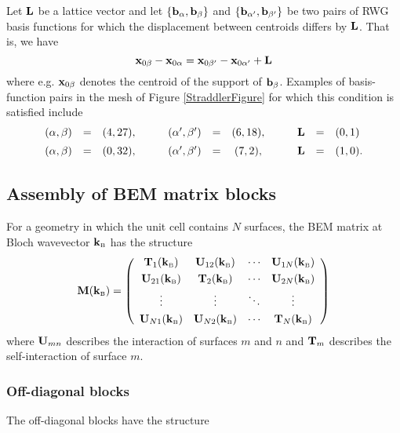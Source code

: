 Let $\mathbf{L}$ be a lattice vector and 
let 
$\{\mathbf{b}_{\alpha}, \mathbf{b}_{\beta}\}$
and 
$\{\mathbf{b}_{\alpha^\prime}, \mathbf{b}_{\beta^\prime}\}$ 
be two pairs of RWG basis functions for which the 
displacement between centroids differs by $\mathbf{L}$.
That is, we have 
$$ \mathbf{x}_{0\beta}-\mathbf{x}_{0\alpha}
   =
   \mathbf{x}_{0\beta^\prime}-\mathbf{x}_{0\alpha^\prime} + \mathbf{L}
$$
where e.g. $\mathbf{x}_{0\beta}$ denotes the centroid of 
the support of $\mathbf{b}_\beta$.
Examples of basis-function pairs in the mesh of 
Figure \ref{StraddlerFigure} for which this condition
is satisfied include
$$\begin{array}{lclclclclcl}
  (\alpha,\beta)&=&(4,27),  
  &\qquad
  (\alpha^\prime,\beta^\prime)&=&(6,18), 
  &\qquad
  \mathbf{L} &=& (0,1)
\\[5pt]
  (\alpha,\beta)&=&(0,32),
  &\qquad
  (\alpha^\prime,\beta^\prime)&=&(7,2), 
  &\qquad
  \mathbf{L} &=& (1,0).
  \end{array}
$$

\subsection{Assembly of BEM matrix blocks}

For a geometry in which the unit cell contains $N$ 
surfaces, the BEM matrix at Bloch wavevector $\mathbf{k}_{\hbox{\tiny{B}}}$ 
has the structure
$$ \mathbf{M}(\mathbf{k}_{\hbox{\tiny{B}}})
 =\left(\begin{array}{cccc}
  \mathbf{T}_1(\mathbf{k}_{\hbox{\tiny{B}}})    & \mathbf{U}_{12}(\mathbf{k}_{\hbox{\tiny{B}}}) & \cdots & \mathbf{U}_{1N}(\mathbf{k}_{\hbox{\tiny{B}}}) \\[3pt]
  \mathbf{U}_{21}(\mathbf{k}_{\hbox{\tiny{B}}}) & \mathbf{T}_2(\mathbf{k}_{\hbox{\tiny{B}}})    & \cdots & \mathbf{U}_{2N}(\mathbf{k}_{\hbox{\tiny{B}}}) \\[3pt]
  \vdots          & \vdots          & \ddots & \vdots      \\[3pt]
  \mathbf{U}_{N1}(\mathbf{k}_{\hbox{\tiny{B}}}) & \mathbf{U}_{N2}(\mathbf{k}_{\hbox{\tiny{B}}}) & \cdots & \mathbf{T}_{N}(\mathbf{k}_{\hbox{\tiny{B}}})
  \end{array}\right)
$$
where $\mathbf{U}_{mn}$ describes the interaction of surfaces $m$
and $n$ and $\mathbf{T}_m$ describes the self-interaction of
surface $m$.

\subsubsection*{Off-diagonal blocks}

The off-diagonal blocks have the structure


